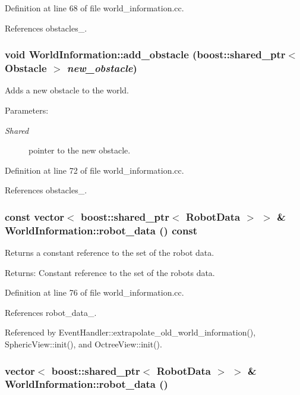Definition at line 68 of file world\_\-information.cc.

References obstacles\_\-.\hypertarget{class_world_information_315a7caced0da0ce9cb10d5db343c541}{
\subsubsection[add\_\-obstacle]{\setlength{\rightskip}{0pt plus 5cm}void WorldInformation::add\_\-obstacle (boost::shared\_\-ptr$<$ Obstacle $>$ {\em new\_\-obstacle})}}
\label{class_world_information_315a7caced0da0ce9cb10d5db343c541}


Adds a new obstacle to the world. \begin{Desc}
\item[Parameters:]
\begin{description}
\item[{\em Shared}]pointer to the new obstacle. \end{description}
\end{Desc}


Definition at line 72 of file world\_\-information.cc.

References obstacles\_\-.\hypertarget{class_world_information_349f45bc117c0c25fb0d68dad8af1917}{
\subsubsection[robot\_\-data]{\setlength{\rightskip}{0pt plus 5cm}const vector$<$ boost::shared\_\-ptr$<$ {\bf RobotData} $>$ $>$ \& WorldInformation::robot\_\-data () const}}
\label{class_world_information_349f45bc117c0c25fb0d68dad8af1917}


Returns a constant reference to the set of the robot data. \begin{Desc}
\item[Returns:]Constant reference to the set of the robots data. \end{Desc}


Definition at line 76 of file world\_\-information.cc.

References robot\_\-data\_\-.

Referenced by EventHandler::extrapolate\_\-old\_\-world\_\-information(), SphericView::init(), and OctreeView::init().\hypertarget{class_world_information_a4a03f11d75d6a9c036222c58733d1ab}{
\subsubsection[robot\_\-data]{\setlength{\rightskip}{0pt plus 5cm}vector$<$ boost::shared\_\-ptr$<$ {\bf RobotData} $>$ $>$ \& WorldInformation::robot\_\-data ()}}
\label{class_world_information_a4a03f11d75d6a9c036222c58733d1ab}


